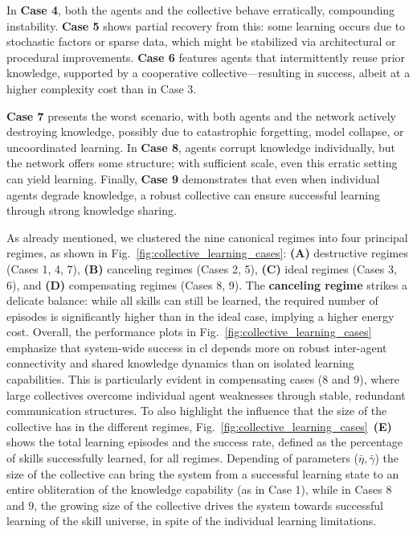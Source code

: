 \documentclass[12pt]{article}
\begin{document}
In \textbf{Case 4}, both the agents and the collective behave erratically, compounding instability. \textbf{Case 5} shows partial recovery from this: some learning occurs due to stochastic factors or sparse data, which might be stabilized via architectural or procedural improvements. \textbf{Case 6} features agents that intermittently reuse prior knowledge, supported by a cooperative collective—resulting in success, albeit at a higher complexity cost than in Case 3.

\textbf{Case 7} presents the worst scenario, with both agents and the network actively destroying knowledge, possibly due to catastrophic forgetting, model collapse, or uncoordinated learning. In \textbf{Case 8}, agents corrupt knowledge individually, but the network offers some structure; with sufficient scale, even this erratic setting can yield learning. Finally, \textbf{Case 9} demonstrates that even when individual agents degrade knowledge, a robust collective can ensure successful learning through strong knowledge sharing.

As already mentioned, we clustered the nine canonical regimes into four principal regimes, as shown in Fig.~\ref{fig:collective_learning_cases}: \textbf{(A)} destructive regimes (Cases 1, 4, 7), \textbf{(B)} canceling regimes (Cases 2, 5), \textbf{(C)} ideal regimes (Cases 3, 6), and \textbf{(D)} compensating regimes (Cases 8, 9). The \textbf{canceling regime} strikes a delicate balance: while all skills can still be learned, the required number of episodes is significantly higher than in the ideal case, implying a higher energy cost. Overall, the performance plots in Fig.~\ref{fig:collective_learning_cases} emphasize that system-wide success in \acl{cl} depends more on robust inter-agent connectivity and shared knowledge dynamics than on isolated learning capabilities. This is particularly evident in compensating cases (8 and 9), where large collectives overcome individual agent weaknesses through stable, redundant communication structures. To also highlight the influence that the size of the collective has in the different regimes, Fig.~\ref{fig:collective_learning_cases}~\textbf{(E)} shows the total learning episodes and the success rate, defined as the percentage of skills successfully learned, for all regimes. Depending of parameters ($\bar{\eta},\bar{\gamma}$) the size of the collective can bring the system from a successful learning state to an entire obliteration of the knowledge capability (as in Case 1), while in Cases 8 and 9, the growing size of the collective drives the system towards successful learning of the skill universe, in spite of the individual learning limitations.
\end{document}
